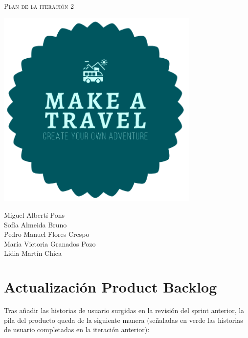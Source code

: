 \documentclass[11pt]{article}
\begin{document}
\begin{titlepage}
  \centering
  \vspace{4.5cm}
         {\scshape\LARGE Plan de la iteración 2\par}
         \vspace{1.5cm}

         \includegraphics[width=10cm] {Logo}

         \vspace{3cm}
                {\scshape\large \par}
                \vspace{1cm}

                {Miguel Albertí Pons\\
                  Sofía Almeida Bruno\\
                  Pedro Manuel Flores Crespo\\
                  María Victoria Granados Pozo\\
                  Lidia Martín Chica
                  \par}

\end{titlepage}

\newpage

\section{Actualización Product Backlog}
Tras añadir las historias de usuario surgidas en la revisión del sprint anterior, la pila del producto queda de la siguiente manera (señaladas en verde las historias de usuario completadas en la iteración anterior):
\end{document}
